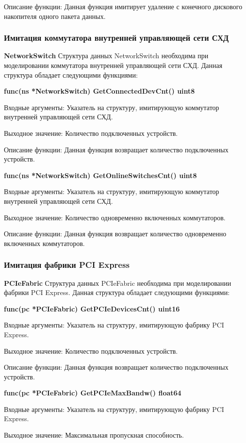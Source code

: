 Описание функции: Данная функция имитирует удаление с конечного дискового накопителя одного пакета данных.

\subsubsection{Имитация коммутатора внутренней управляющей сети СХД}
\textbf{NetworkSwitch}
Структура данных NetworkSwitch необходима при моделировании коммутатора внутренней управляющей сети СХД. Данная структура обладает следующими функциями:

\textbf{func(ns *NetworkSwitch) GetConnectedDevCnt() uint8}

Входные аргументы: Указатель на структуру, имитирующую коммутатор внутренней управляющей сети СХД.

Выходное значение: Количество подключенных устройств.

Описание функции: Данная функция возвращает количество подключенных устройств.

\textbf{func(ns *NetworkSwitch) GetOnlineSwitchesCnt() uint8}

Входные аргументы: Указатель на структуру, имитирующую коммутатор внутренней управляющей сети СХД.

Выходное значение: Количество одновременно включенных коммутаторов.

Описание функции: Данная функция возвращает количество одновременно включенных коммутаторов.

\subsubsection{Имитация фабрики PCI Express}
\textbf{PCIeFabric}
Структура данных PCIeFabric необходима при моделировании фабрики PCI Express. Данная структура обладает следующими функциями:

\textbf{func(pc *PCIeFabric) GetPCIeDevicesCnt() uint16}

Входные аргументы: Указатель на структуру, имитирующую фабрику PCI Express.

Выходное значение: Количество подключенных устройств.

Описание функции: Данная функция возвращает количество подключенных устройств.


\textbf{func(pc *PCIeFabric) GetPCIeMaxBandw() float64}

Входные аргументы: Указатель на структуру, имитирующую фабрику PCI Express.

Выходное значение: Максимальная пропускная способность.

